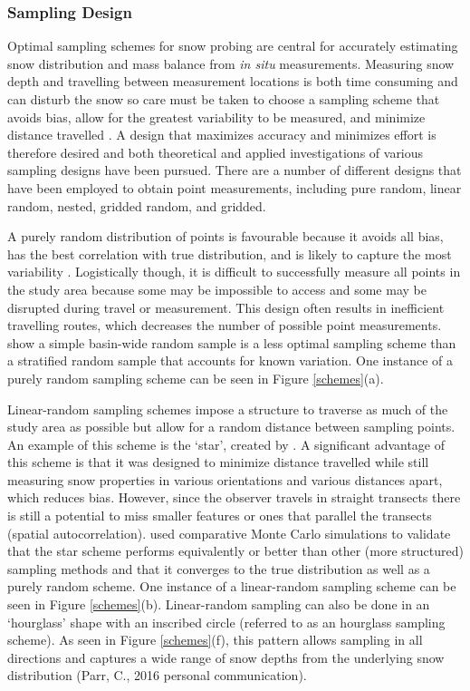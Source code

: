 \documentclass{sfuthesis}
\begin{document}
\subsubsection{Sampling Design}

Optimal sampling schemes for snow probing are central for accurately estimating snow distribution and mass balance from \textit{in situ} measurements. Measuring snow depth and travelling between measurement locations is both time consuming and can disturb the snow so care must be taken to choose a sampling scheme that avoids bias, allow for the greatest variability to be measured, and minimize distance travelled \citep{Shea2010}. A design that maximizes accuracy and minimizes effort is therefore desired \citep{Elder1991} and both theoretical \citep{Trujillo2015} and applied \citep{Kronholm2004,Shea2010} investigations of various sampling designs have been pursued. There are a number of different designs that have been employed to obtain point measurements, including pure random, linear random, nested, gridded random, and gridded. 

A purely random distribution of points is favourable because it avoids all bias, has the best correlation with true distribution, and is likely to capture the most variability \citep{Kronholm2007, Shea2010}. Logistically though, it is difficult to successfully measure all points in the study area because some may be impossible to access and some may be disrupted during travel or measurement. This design often results in inefficient travelling routes, which decreases the number of possible point measurements. \cite{Elder1991} show a simple basin-wide random sample is a less optimal sampling scheme than a stratified random sample that accounts for known variation. One instance of a purely random sampling scheme can be seen in Figure \ref{schemes}(a). 

Linear-random sampling schemes impose a structure to traverse as much of the study area as possible but allow for a random distance between sampling points. An example of this scheme is the `star', created by \cite{Shea2010}. A significant advantage of this scheme is that it was designed to minimize distance travelled while still measuring snow properties in various orientations and various distances apart, which reduces bias. However, since the observer travels in straight transects there is still a potential to miss smaller features or ones that parallel the transects (spatial autocorrelation). \cite{Shea2010} used comparative Monte Carlo simulations to validate that the star scheme performs equivalently or better than other (more structured) sampling methods and that it converges to the true distribution as well as a purely random scheme. One instance of a linear-random sampling scheme can be seen in Figure \ref{schemes}(b). Linear-random sampling can also be done in an `hourglass' shape with an inscribed circle (referred to as an hourglass sampling scheme). As seen in Figure \ref{schemes}(f), this pattern allows sampling in all directions and captures a wide range of snow depths from the underlying snow distribution (Parr, C., 2016 personal communication).
\end{document}
